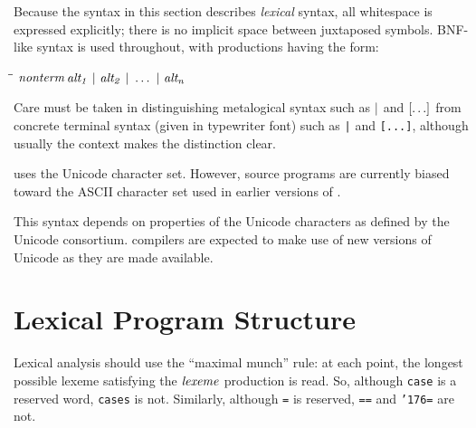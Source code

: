 Because the syntax in this section describes {\em lexical} syntax, all
whitespace is expressed explicitly; there is no
implicit space between juxtaposed symbols.  BNF-like syntax is used
throughout, with productions having the form:
\begin{flushleft}\it\begin{tabbing}
\hspace{0.6in}\=\hspace{3.1in}\=\kill
$\it nonterm$\>\makebox[3.5em]{$\rightarrow$}$\it alt_1\ |\ alt_2\ |\ \ldots \ |\ alt_n$
\end{tabbing}\end{flushleft}

Care must be taken in distinguishing metalogical syntax such as \mbox{$\it |$}
and \mbox{$\it [\ldots ]$} from concrete terminal syntax (given in typewriter font)
such as \mbox{\tt |} and \mbox{\tt [...]}, although usually the context makes the
distinction clear.

\Haskell{} uses the Unicode \cite{unicode} character set.
However, source 
programs are currently biased toward the ASCII character set
 used in earlier versions of \Haskell{}.


This syntax depends on properties of the Unicode characters as defined
by the Unicode consortium. 
\Haskell{} compilers are expected to make use of
new versions of Unicode as they are made available.

\section{Lexical Program Structure}
\label{lexemes}
\label{whitespace}



Lexical analysis should use the ``maximal munch'' rule:
at each point, the longest possible lexeme
satisfying the \mbox{$\it lexeme$} production is read.
So, although \mbox{\tt case} is a reserved word, \mbox{\tt cases} is not.
Similarly, although \mbox{\tt =} is reserved, \mbox{\tt ==} and \mbox{\tt {\char'176}=} are
not.  

